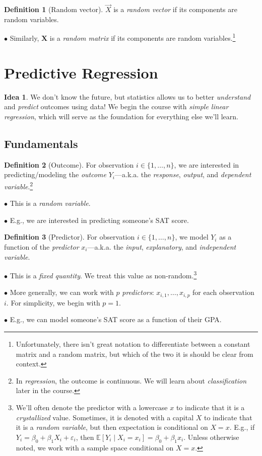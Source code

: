 \documentclass[12pt,oneside]{article}
\newcommand{\E}{\mathbb{E}}
\theoremstyle{definition}
\newtheorem{definition}{Definition}
\newtheorem*{idea}{Idea}
\theoremstyle{remark}
\begin{document}
\begin{definition}[Random vector]
$\vec{X}$ is a \textit{random vector} if its components are random variables.

$\bullet$ Similarly, $\boldsymbol{X}$ is a \textit{random matrix} if its components are random variables.\footnote{Unfortunately, there isn't great notation to differentiate between a constant matrix and a random matrix, but which of the two it is should be clear from context.}
\end{definition}

\section{Predictive Regression}

\begin{idea}
We don't know the future, but statistics allows us to better \textit{understand} and \textit{predict} outcomes using data! We begin the course with \textit{simple linear regression}, which will serve as the foundation for everything else we'll learn.
\end{idea}

\subsection{Fundamentals}

\begin{definition}[Outcome]
For observation $i \in \{1, \ldots, n\}$, we are interested in predicting/modeling the \textit{outcome} $Y_i$—a.k.a. the \textit{response}, \textit{output}, and \textit{dependent variable}.\footnote{In \textit{regression}, the outcome is continuous. We will learn about \textit{classification} later in the course.}

$\bullet$ This is a \textit{random variable}.

$\bullet$ E.g., we are interested in predicting someone's SAT score.
\end{definition}

\begin{definition}[Predictor]
For observation $i \in \{1, \ldots, n\}$, we model $Y_i$ as a function of the \textit{predictor} $x_i$—a.k.a. the \textit{input}, \textit{explanatory}, and \textit{independent variable}.

$\bullet$ This is a \textit{fixed quantity}. We treat this value as non-random.\footnote{We'll often denote the predictor with a lowercase $x$ to indicate that it is a \textit{crystallized} value. Sometimes, it is denoted with a capital $X$ to indicate that it is a \textit{random variable}, but then expectation is conditional on $X = x$. E.g., if $Y_i = \beta_0 + \beta_1 X_i + \varepsilon_i$, then $\E[Y_i \mid X_i = x_i] = \beta_0 + \beta_1 x_i$. Unless otherwise noted, we work with a sample space conditional on $X = x$.}

$\bullet$ More generally, we can work with $p$ \textit{predictors}: $x_{i, 1}, \ldots, x_{i, p}$ for each observation $i$. For simplicity, we begin with $p = 1$.

$\bullet$ E.g., we can model someone's SAT score as a function of their GPA.
\end{definition}
\end{document}
